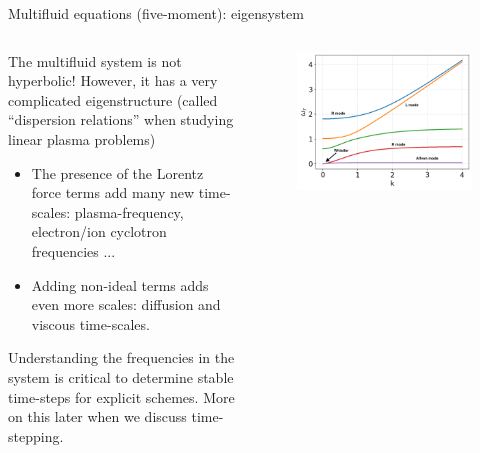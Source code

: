 \documentclass[aspectratio=169]{beamer}
\begin{document}
\begin{frame}{Multifluid equations (five-moment): eigensystem}
  \small%
  \begin{columns}  
    \begin{column}{0.5\linewidth}
      The multifluid system is not hyperbolic! However, it has a very
      complicated eigenstructure (called ``dispersion relations'' when
      studying linear plasma problems)
      \begin{itemize}
      \item The presence of the Lorentz force terms add many new
        time-scales: plasma-frequency, electron/ion cyclotron frequencies
        ...
      \item Adding non-ideal terms adds even more scales: diffusion and
        viscous time-scales.
      \end{itemize}
      Understanding the frequencies in the system is critical to
      determine stable time-steps for explicit schemes. More on this
      later when we discuss time-stepping.
    \end{column}
    
    \begin{column}{0.5\linewidth}
      \begin{figure}    
        \includegraphics[width=\linewidth]{iso-cold-waves.png}
      \end{figure}
    \end{column}
  \end{columns}
  
\end{frame}
\end{document}
